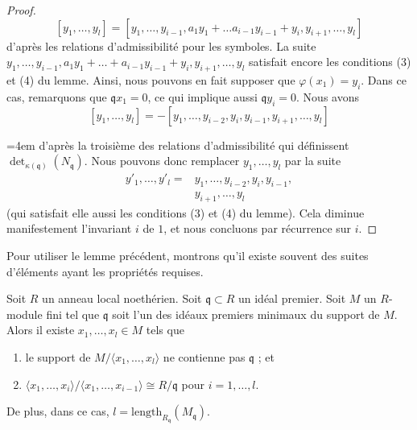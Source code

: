 \begin{proof}
$$
[y_1, \ldots, y_l] = [y_1, \ldots, y_{i - 1},
a_1y_1 + \ldots a_{i - 1}y_{i - 1} + y_i, y_{i + 1}, \ldots, y_l]
$$
d'après les relations d'admissibilité pour les symboles. La suite
$y_1, \ldots, y_{i - 1},
a_1y_1 + \ldots + a_{i - 1}y_{i - 1} + y_i, y_{i + 1}, \ldots, y_l$
satisfait encore les conditions (3) et (4) du lemme.
Ainsi, nous pouvons en fait
supposer que $\varphi(x_1) = y_i$. Dans ce cas, remarquons que
$\mathfrak q x_1 = 0$, ce qui implique aussi $\mathfrak q y_i = 0$.
Nous avons
$$
[y_1, \ldots, y_l] =
- [y_1, \ldots, y_{i - 2}, y_i, y_{i - 1}, y_{i + 1}, \ldots, y_l]
$$
{\emergencystretch=4em d'après la troisième des relations d'admissibilité qui définissent
$\det_{\kappa(\mathfrak q)}(N_{\mathfrak q})$. Nous pouvons donc
remplacer $y_1, \ldots, y_l$ par
la suite
$$
\begin{aligned}
y'_1, \ldots, y'_l ={}&
y_1, \ldots, y_{i - 2}, y_i, y_{i - 1}, \\
&y_{i + 1}, \ldots, y_l
\end{aligned}
$$
(qui satisfait elle aussi les conditions (3) et (4) du lemme).
Cela diminue manifestement l'invariant $i$ de $1$, et nous concluons par récurrence
sur $i$.\par}
\end{proof}

\noindent
Pour utiliser le lemme précédent, montrons qu'il existe souvent des suites d'éléments
ayant les propriétés requises.

\begin{lemma}
\label{lemma-good-sequence-exists}
Soit $R$ un anneau local noethérien.
Soit $\mathfrak q \subset R$ un idéal premier.
Soit $M$ un $R$-module fini tel que
$\mathfrak q$ soit l'un des idéaux premiers minimaux du support de $M$.
Alors il existe $x_1, \ldots, x_l \in M$ tels que
\begin{enumerate}
\item le support de $M / \langle x_1, \ldots, x_l\rangle$ ne contienne pas
$\mathfrak q$ ; et
\item $\langle x_1, \ldots, x_i\rangle / \langle x_1, \ldots, x_{i - 1}\rangle
\cong R/\mathfrak q$ pour $i = 1, \ldots, l$.
\end{enumerate}
De plus, dans ce cas, $l = \text{length}_{R_\mathfrak q}(M_\mathfrak q)$.
\end{lemma}

